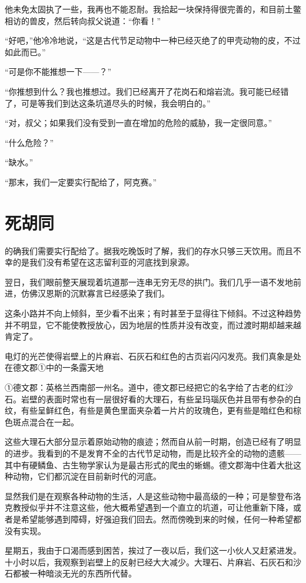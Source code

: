 \documentclass[10pt]{book}
\begin{document}
他未免太固执了一些，我再也不能忍耐。我拾起一块保持得很完善的，和目前土鳖相访的兽皮，然后转向叔父说道：“你看！”

“好吧，”他冷冷地说，“这是古代节足动物中一种已经灭绝了的甲壳动物的皮，不过如此而已。”

“可是你不能推想一下——？”

“你推想到什么？我也推想过。我们已经离开了花岗石和熔岩流。我可能已经错了，可是等我们到达这条坑道尽头的时候，我会明白的。”

“对，叔父；如果我们没有受到一直在增加的危险的威胁，我一定很同意。”

“什么危险？”

“缺水。”

“那末，我们一定要实行配给了，阿克赛。”
\chapter{死胡同}
的确我们需要实行配给了。据我吃晚饭时了解，我们的存水只够三天饮用。而且不幸的是我们没有希望在这志留利亚的河底找到泉源。

翌日，我们眼前整天展现着坑道那一连串无穷无尽的拱门。我们几乎一语不发地前进，仿佛汉恩斯的沉默寡言已经感染了我们。

这条小路并不向上倾斜，至少看不出来；有时甚至于显得往下倾斜。不过这种趋势并不明显，它不能使教授放心，因为地层的性质并没有改变，而过渡时期却越来越肯定了。

电灯的光芒使得岩壁上的片麻岩、石灰石和红色的古页岩闪闪发亮。我们真象是处在德文郡①中的一条露天地

①德文郡：英格兰西南部一州名。道中，德文郡已经把它的名字给了古老的红沙石。岩壁的表面时常也有一层很好看的大理石，有些呈玛瑙灰色并且带有参杂的白纹，有些呈鲜红色，有些是黄色里面夹杂着一片片的玫瑰色，更有些是暗红色和棕色斑点混合在一起。

这些大理石大部分显示着原始动物的痕迹；然而自从前一时期，创造已经有了明显的进步。我看到的不是发育不全的古代节足动物，而是比较齐全的动物的遗骸——其中有硬鳞鱼、古生物学家认为是最古形式的爬虫的蜥蜴。德文郡海中住着大批这种动物，它们都沉淀在目前新时代的河底。

显然我们是在观察各种动物的生活，人是这些动物中最高级的一种；可是黎登布洛克教授似乎并不注意这些，他大概希望遇到一个直立的坑道，可让他重新下降，或者是希望能够遇到障碍，好强迫我们回去。然而傍晚到来的时候，任何一种希望都没有实现。

星期五，我由于口渴而感到困苦，挨过了一夜以后，我们这一小伙人又赶紧进发。十小时以后，我观察到岩壁上的反射已经大大减少。大理石、片麻岩、石灰石和沙石都被一种暗淡无光的东西所代替。
\end{document}
